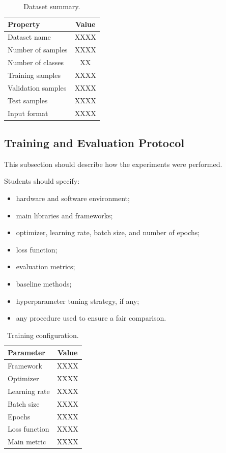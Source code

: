\documentclass[10pt,twocolumn,a4paper]{article}
\begin{document}
 \begin{table}[h]
  \centering
  \caption{Dataset summary.}
  \label{tab:dataset}
  \begin{tabular}{|l|c|}
   \hline
   \textbf{Property} & \textbf{Value} \\
   \hline
   Dataset name & XXXX \\
   Number of samples & XXXX \\
   Number of classes & XX \\
   Training samples & XXXX \\
   Validation samples & XXXX \\
   Test samples & XXXX \\
   Input format & XXXX \\
   \hline
  \end{tabular}
 \end{table}
 
 \subsection{Training and Evaluation Protocol}
 
 This subsection should describe how the experiments were performed.
 
 Students should specify:
 \begin{itemize}
  \item hardware and software environment;
  \item main libraries and frameworks;
  \item optimizer, learning rate, batch size, and number of epochs;
  \item loss function;
  \item evaluation metrics;
  \item baseline methods;
  \item hyperparameter tuning strategy, if any;
  \item any procedure used to ensure a fair comparison.
 \end{itemize}
 
 \begin{table}[h]
  \centering
  \caption{Training configuration.}
  \label{tab:training}
  \begin{tabular}{|l|c|}
   \hline
   \textbf{Parameter} & \textbf{Value} \\
   \hline
   Framework & XXXX \\
   Optimizer & XXXX \\
   Learning rate & XXXX \\
   Batch size & XXXX \\
   Epochs & XXXX \\
   Loss function & XXXX \\
   Main metric & XXXX \\
   \hline
  \end{tabular}
 \end{table}
 
\end{document}
